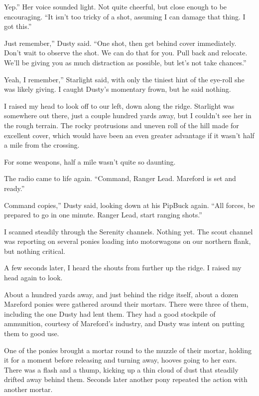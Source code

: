 \leavevmode{}Yep.” Her voice sounded light. Not quite cheerful, but close enough to be encouraging. “It isn’t too tricky of a shot, assuming I can damage that thing. I got this.”

\leavevmode{}Just remember,” Dusty said. “One shot, then get behind cover immediately. Don’t wait to observe the shot. We can do that for you. Pull back and relocate. We’ll be giving you as much distraction as possible, but let’s not take chances.”

\leavevmode{}Yeah, I remember,” Starlight said, with only the tiniest hint of the eye-roll she was likely giving. I caught Dusty’s momentary frown, but he said nothing.

I raised my head to look off to our left, down along the ridge. Starlight was somewhere out there, just a couple hundred yards away, but I couldn’t see her in the rough terrain. The rocky protrusions and uneven roll of the hill made for excellent cover, which would have been an even greater advantage if it wasn’t half a mile from the crossing.

For some weapons, half a mile wasn’t quite so daunting.

The radio came to life again. “Command, Ranger Lead. Mareford is set and ready.”

\leavevmode{}Command copies,” Dusty said, looking down at his PipBuck again. “All forces, be prepared to go in one minute. Ranger Lead, start ranging shots.”

I scanned steadily through the Serenity channels. Nothing yet. The scout channel was reporting on several ponies loading into motorwagons on our northern flank, but nothing critical.

A few seconds later, I heard the shouts from further up the ridge. I raised my head again to look.

About a hundred yards away, and just behind the ridge itself, about a dozen Mareford ponies were gathered around their mortars. There were three of them, including the one Dusty had lent them. They had a good stockpile of ammunition, courtesy of Mareford’s industry, and Dusty was intent on putting them to good use.

One of the ponies brought a mortar round to the muzzle of their mortar, holding it for a moment before releasing and turning away, hooves going to her ears. There was a flash and a thump, kicking up a thin cloud of dust that steadily drifted away behind them. Seconds later another pony repeated the action with another mortar.

